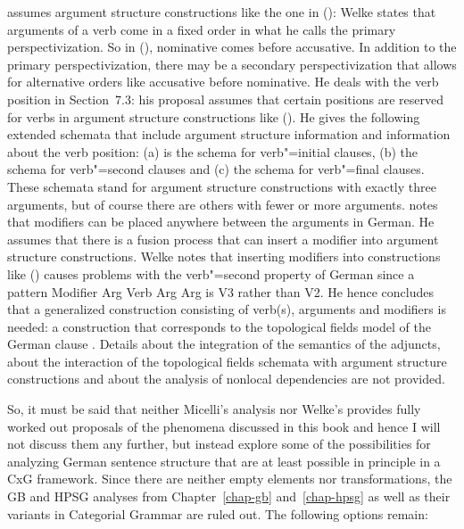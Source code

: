 \citet[]{Welke2019a-u} assumes argument structure constructions like the one in ():
\ea
{}
\z
Welke states that arguments of a verb come in a fixed order in what he calls the primary
perspectivization. So in (), nominative comes before accusative. In addition to the primary
perspectivization, there may be a secondary perspectivization that allows for alternative orders
like accusative before nominative. He
deals with the verb position in Section~7.3: his proposal assumes that certain positions are
reserved for verbs in argument structure constructions like (). He gives the following
extended schemata that include argument structure information and information about the verb
position:
\eal
\ex {}
\ex {}
\ex {}
\zl
(a) is the schema for verb"=initial clauses, (b) the schema for verb"=second clauses and
(c) the schema for verb"=final clauses. These schemata stand for argument structure
constructions with exactly three arguments, but of course there are others with fewer or more
arguments. \citet[Section~7.4]{Welke2019a-u} notes that modifiers can be placed anywhere between the
arguments in German. He assumes that there is a fusion process that can insert a modifier into
argument structure constructions. Welke notes that inserting modifiers into constructions like
() causes problems with the verb"=second property of German since a pattern Modifier Arg Verb
Arg Arg is V3 rather than V2. He hence concludes that a generalized construction consisting of
verb(s), arguments and modifiers is needed: a construction that corresponds to the topological
fields model of the German clause \citep[Section~7.5]{Welke2019a-u}. Details about the integration
of the semantics of the adjuncts, about the interaction of the topological fields schemata with
argument structure constructions and about the analysis of nonlocal dependencies are not provided.

So, it must be said that neither Micelli's analysis nor Welke's provides fully worked out proposals
of the phenomena discussed in this book and hence I will not discuss them any further, but instead explore some of the possibilities for analyzing German sentence
structure that are at least possible in principle in a CxG framework. Since there are neither empty
elements nor transformations, the GB and HPSG analyses from Chapter~\ref{chap-gb} and~\ref{chap-hpsg}
as well as their variants in Categorial Grammar are ruled out.
The following options remain:

